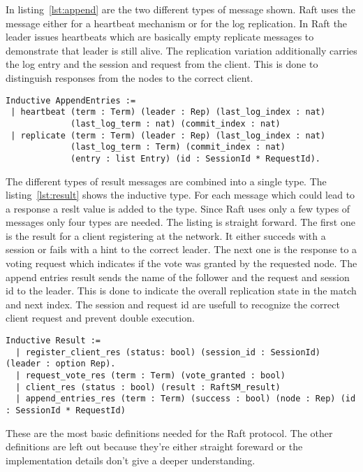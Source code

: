 In listing~\ref{lst:append} are the two different types of 
message shown. Raft uses the message either for a heartbeat mechanism or for
the log replication. In Raft the leader issues heartbeats which are basically
empty replicate messages to demonstrate that leader is still alive. The
replication variation additionally carries the log entry and the session and
request from the client. This is done to distinguish responses from the nodes
to the correct client. 

\begin{lstlisting}[style=coq,label=lst:append,
caption=The two possible append entry calls in Raft.]
Inductive AppendEntries :=
 | heartbeat (term : Term) (leader : Rep) (last_log_index : nat)
             (last_log_term : nat) (commit_index : nat)
 | replicate (term : Term) (leader : Rep) (last_log_index : nat)
             (last_log_term : Term) (commit_index : nat)
             (entry : list Entry) (id : SessionId * RequestId).
\end{lstlisting}

The different types of result messages are combined into a single 
type. The listing~\ref{lst:result} shows the inductive type. For each
message which could lead to a response a reslt value is added to the type.
Since Raft uses only a few types of messages only four types are needed.
The listing is straight forward. The first one is the result for a client
registering at the network. It either succeds with a session or fails
with a hint to the correct leader. The next one is the response to
a voting request which indicates if the vote was granted by the requested
node. The append entries result sends the name of the follower and the request and
session id to the leader. This is done to indicate the overall replication state
in the match and next index. The session and request id are usefull to
recognize the correct client request and prevent double execution.

\begin{lstlisting}[style=coq,label=lst:result,
caption=The inductive result type for all response messages.]
Inductive Result :=
  | register_client_res (status: bool) (session_id : SessionId) (leader : option Rep).
  | request_vote_res (term : Term) (vote_granted : bool)
  | client_res (status : bool) (result : RaftSM_result)
  | append_entries_res (term : Term) (success : bool) (node : Rep) (id : SessionId * RequestId)
\end{lstlisting}

These are the most basic definitions needed for the Raft protocol. The other
definitions are left out because they're either straight foreward or the
implementation details don't give a deeper understanding.

